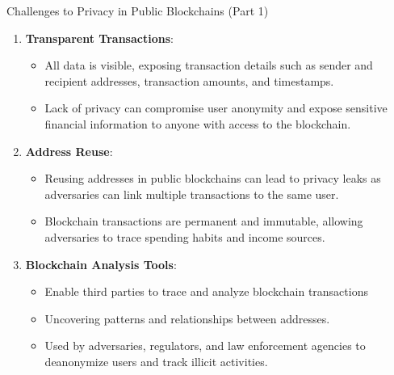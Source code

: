 \begin{frame}{Challenges to Privacy in Public Blockchains (Part 1)}
    \begin{enumerate}
        \item \textbf{Transparent Transactions}:
            \begin{itemize}
                \item All data is visible, exposing transaction details such as sender and recipient addresses, transaction amounts, and timestamps.
                \item Lack of privacy can compromise user anonymity and expose sensitive financial information to anyone with access to the blockchain.
            \end{itemize}
        
        \item \textbf{Address Reuse}:
            \begin{itemize}
                \item Reusing addresses in public blockchains can lead to privacy leaks as adversaries can link multiple transactions to the same user.
                \item Blockchain transactions are permanent and immutable, allowing adversaries to trace spending habits and income sources.
            \end{itemize}
        
        \item \textbf{Blockchain Analysis Tools}:
            \begin{itemize}
                \item Enable third parties to trace and analyze blockchain transactions
                \item Uncovering patterns and relationships between addresses.
                \item Used by adversaries, regulators, and law enforcement agencies to deanonymize users and track illicit activities.
            \end{itemize}
    \end{enumerate}
\end{frame}


